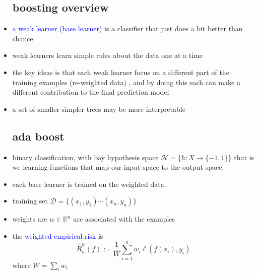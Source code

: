 \documentclass{article}
\begin{document}
\begin{itemize}
\subsection*{boosting overview}
\item \textcolor{blue}{a weak learner (base learner)} is a classifier that just does a bit better than chance 
\item weak learners learn simple rules about the data one at a time 
\item the key ideas is that each weak learner focus on a different part of the training examples (re-weighted data) , and by doing this each can make a different contribution to the final prediction model
\item a set of smaller simpler trees may be more interpretable 
\subsection*{ada boost}
\item binary classification, with bay hypothesis space $\mathcal{H}=\{h:X\rightarrow \{-1,1\}\}$ that is we learning functions that map our input space to the output space. 
\item each base learner is trained on the weighted data. 
\item training set $\mathcal{D}=\{(x_1,y_1)\cdots (x_n,y_n)\}$
\item weights are $w\in \mathbb{R}^{n}$ are associated with the examples
\item the \textcolor{blue}{weighted empirical risk} is $$\hat{R}_{n}^{w}(f):=\frac{1}{W}\sum_{i=1}^{n}w_i\ell(f(x_i),y_i)$$ where $W=\sum_i w_i$

\end{itemize}
\end{document}
